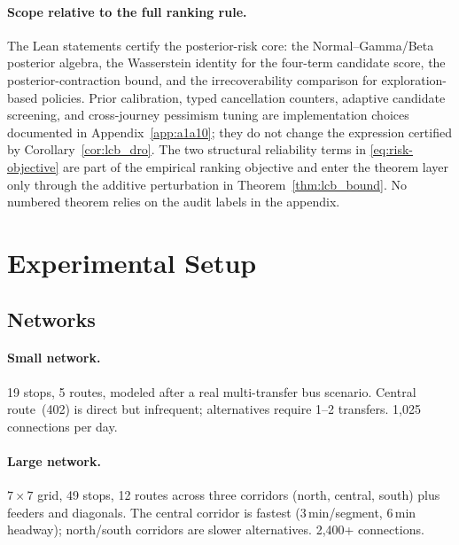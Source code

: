 \documentclass[opre,dblanonrev]{informs4}
\begin{document}
\paragraph{Scope relative to the full ranking rule.}
The Lean statements certify the posterior-risk core: the
Normal--Gamma/Beta posterior algebra, the Wasserstein identity for
the four-term candidate score, the posterior-contraction bound, and
the irrecoverability comparison for exploration-based policies. Prior
calibration, typed cancellation counters, adaptive candidate
screening, and cross-journey pessimism tuning are implementation
choices documented in Appendix~\ref{app:a1a10}; they do not change
the expression certified by Corollary~\ref{cor:lcb_dro}. The two
structural reliability terms in \eqref{eq:risk-objective} are part of
the empirical ranking objective and enter the theorem layer only
through the additive perturbation in
Theorem~\ref{thm:lcb_bound}. No numbered theorem relies on the audit
labels in the appendix.

\section{Experimental Setup}
\label{sec:setup}

\subsection{Networks}

\paragraph{Small network.} 19 stops, 5 routes, modeled after a real multi-transfer bus scenario. Central route~(402) is direct but infrequent; alternatives require 1--2 transfers. 1,025 connections per day.

\paragraph{Large network.} $7{\times}7$ grid, 49 stops, 12 routes across three corridors (north, central, south) plus feeders and diagonals. The central corridor is fastest (3\,min/segment, 6\,min headway); north/south corridors are slower alternatives. 2,400+ connections.
\end{document}
